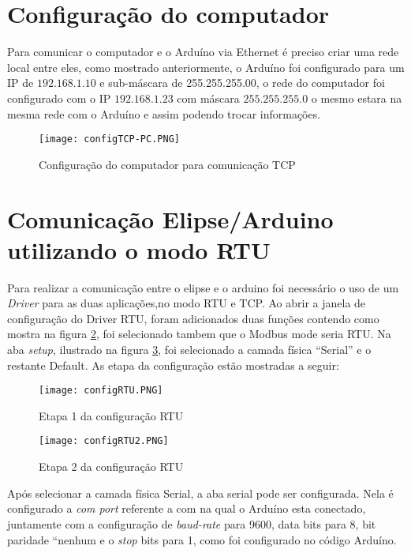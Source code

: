 \section{Configuração do computador}
Para comunicar o computador e o Arduíno via Ethernet é preciso criar uma rede local entre eles, como mostrado anteriormente, o Arduíno foi configurado para um IP de $192.168.1.10$ e sub-máscara de 255.255.255.00, o rede do computador foi configurado com o IP $192.168.1.23$ com máscara $255.255.255$.0 o mesmo estara na mesma rede com o Arduíno e assim podendo trocar informações.
\begin{figure}[H]
	\centering
	\texttt{[image: configTCP-PC.PNG]}
	\caption{Configuração do computador para comunicação TCP}
	\label{fig:tcp_config1}
\end{figure}
\section{Comunicação Elipse/Arduino utilizando o modo RTU}
Para realizar a comunicação entre o elipse e o arduino foi necessário o uso de um \textit{Driver} para as duas aplicações,no modo RTU e TCP. Ao abrir a janela de configuração do Driver RTU, foram adicionados duas funções contendo como mostra na figura \ref{fig:rtu_config1}, foi selecionado tambem que o Modbus mode seria RTU. 
Na aba \textit{setup}, ilustrado na figura \ref{fig:rtu_config2}, foi selecionado a camada física “Serial” e o restante Default. As etapa da configuração estão mostradas a seguir: 

\begin{figure}[H]
	\centering
	\texttt{[image: configRTU.PNG]}
	\caption{Etapa 1 da configuração RTU}
	\label{fig:rtu_config1}
\end{figure}

\begin{figure}[H]
	\centering
	\texttt{[image: configRTU2.PNG]}
	\caption{Etapa 2 da configuração RTU}
	\label{fig:rtu_config2}
\end{figure}

Após selecionar a camada física Serial, a aba serial pode ser configurada. Nela é configurado a \textit{com port} referente a com na qual o Arduíno esta conectado, juntamente com a configuração de \textit{baud-rate} para 9600, data bits para 8, bit paridade “nenhum e o \textit{stop} bits para 1, como foi configurado no código Arduíno.

